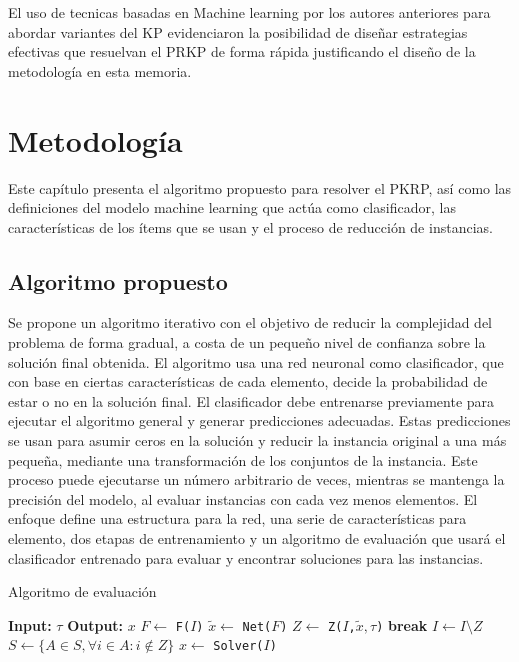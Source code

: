 \documentclass[spanish, a4paper, 12pt, openany,final]{book}
\begin{document}
El uso de tecnicas basadas en Machine learning por los autores anteriores para abordar variantes del KP evidenciaron la posibilidad de diseñar estrategias efectivas que resuelvan el PRKP de forma rápida justificando el diseño de la metodología en esta memoria.
 

\chapter{Metodología}

Este capítulo presenta el algoritmo propuesto para resolver el PKRP, así como las definiciones del modelo machine learning que actúa como clasificador, las características de los ítems que se usan y el proceso de reducción de instancias.

\section{Algoritmo propuesto}

Se propone un algoritmo iterativo con el objetivo de reducir la complejidad del problema de forma gradual, a costa de un pequeño nivel de confianza sobre la solución final obtenida. El algoritmo usa una red neuronal como clasificador, que con base en ciertas características de cada elemento, decide la probabilidad de estar o no en la solución final. El clasificador debe entrenarse previamente para ejecutar el algoritmo general y generar predicciones adecuadas. Estas predicciones se usan para asumir ceros en la solución y reducir la instancia original a una más pequeña, mediante una transformación de los conjuntos de la instancia. Este proceso puede ejecutarse un número arbitrario de veces, mientras se mantenga la precisión del modelo, al evaluar instancias con cada vez menos elementos. El enfoque define una estructura para la red, una serie de características para elemento, dos etapas de entrenamiento y un algoritmo de evaluación que usará el clasificador entrenado para evaluar y encontrar soluciones para las instancias.


\begin{algorithm}[H]
	\caption{Algoritmo de evaluación}\label{alg:general}
	\begin{algorithmic}[1]
		\Statex \textbf{Input:} $\tau$
		\Statex \textbf{Output:} $x$
		\Loop
		\State $F \gets$ \texttt{F($I$)}\label{alg1:full_features}
		\State $\tilde{x} \gets$ \texttt{Net($F$)} \label{alg1:get_pred}
		\State $Z \gets$ \texttt{Z($I$,$\tilde{x},\tau$)} \label{alg1:get_Z}
		 \label{alg1:break_condition}
		\State \textbf{break}
		\EndIf
		\State $I \gets I\setminus Z$ 								\label{alg1:update_I}
		\State $S \gets \{A \in S, \forall i \in A: i \notin Z\}$  \label{alg1:update_S}
		\EndLoop
		\State $x \gets$ \texttt{Solver($I$)} \label{alg1:exact_solver} 
	\end{algorithmic}
\end{algorithm}
\end{document}
